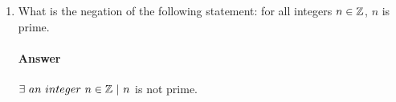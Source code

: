 \documentclass{article}
\begin{document}
\begin{enumerate}

	      \paragraph{Answer}
          \begin{proof}
	      For every integer $k \geq 1$, the complete graph on
	      $n$ vertices (denoted by the symbol~$K_n$) has $\frac{n(n-1)}{2}$~edges.
	      For each new vertex added, an edge will be connected to each existing vertex.
	      In other words, for the $n^{th}$ vertex added $n-1$ edges are added. $\frac{n(n-1)}{2}$
	      can be rewritten as $\sum^{n-1}_{k=0} k$

	      {\bf Basis:} $f(1)$ = $\frac{1 (1-1)}{2}$
	      $=\frac{1(0)}{2}$
	      $=0$

	      A graph with 1 vertex has zero edges, so this is true.

          {\bf Inductuve Step: } let $k \in \mathbb{Z}\ \|\ k_{0} = 1$ suppose that f (k) is true,
          we will show that f (k+1) is also true.

          \begin{gather*}
           \sum^{(k+1)-1}_{j=0} j = ( \sum^{k-1}_{j=0} j ) + k\\
          = \frac{k(k-1)}{2} + k\\
          = \frac{k(k-1)}{2} + \frac{2k}{2}\\
          = \frac{k^2 -k + 2k}{2}\\
          = \frac{k^2 + k}{2}
          \end{gather*}

          The other side of the equation is

          \[
              \frac{(k+1)((k+1)-1)}{2} = \frac{k^2 +k}{2}

          \]

          $\therefore f(k+1)$ is true


      \end{proof}

	\item What is the negation of the following statement: for all integers $n
		      \in {\mathbb Z}$, $n$ is prime.

	      \paragraph{Answer}
	      $\exists\ an\ integer\ n \in \Z\ |\ n$ is not prime.

\end{enumerate}
\end{document}
